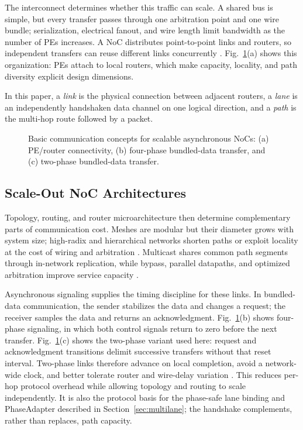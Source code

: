 \documentclass[conference]{IEEEtran}
\begin{document}
The interconnect determines whether this traffic can scale. A shared bus is
simple, but every transfer passes through one arbitration point and one wire
bundle; serialization, electrical fanout, and wire length limit bandwidth as
the number of PEs increases. A NoC distributes point-to-point links and
routers, so independent transfers can reuse different links concurrently
\cite{dally2004book,krishna2013smart}. Fig.~\ref{fig:basic-concepts}(a)
shows this organization: PEs attach to local routers, which make capacity,
locality, and path diversity explicit design dimensions.

In this paper, a \emph{link} is the physical connection between adjacent
routers, a \emph{lane} is an independently handshaken data channel on one
logical direction, and a \emph{path} is the multi-hop route followed by a
packet.

\begin{figure}[!t]
\centering

\caption{Basic communication concepts for scalable asynchronous NoCs:
(a) PE/router connectivity, (b) four-phase bundled-data transfer, and
(c) two-phase bundled-data transfer.}
\label{fig:basic-concepts}
\end{figure}

\subsection{Scale-Out NoC Architectures}\label{sec:scaleout-bg}

Topology, routing, and router microarchitecture then determine complementary
parts of communication cost. Meshes are modular but their diameter grows
with system size; high-radix and hierarchical networks shorten paths or
exploit locality at the cost of wiring and arbitration
\cite{zhong2025paicore}. Multicast shares common path segments through
in-network replication, while bypass, parallel datapaths, and optimized
arbitration improve service capacity
\cite{merolla2014tree,bhardwaj2019cmr,su2025hbs,krishna2013smart,rasheed2014storm,fischer2025floonoc}.

Asynchronous signaling supplies the timing discipline for these links. In
bundled-data communication, the sender stabilizes the data and changes a
request; the receiver samples the data and returns an acknowledgment.
Fig.~\ref{fig:basic-concepts}(b) shows four-phase signaling, in which both
control signals return to zero before the next transfer. Fig.~\ref{fig:basic-concepts}(c)
shows the two-phase variant used here: request and acknowledgment transitions
delimit successive transfers without that reset interval. Two-phase links
therefore advance on local completion, avoid a network-wide clock, and better
tolerate router and wire-delay variation
\cite{ghiribaldi2013transition,jiang2017async14nm,zhang2026reusable}.
This reduces per-hop protocol overhead while allowing topology and routing to
scale independently. It is also the protocol basis for the phase-safe lane
binding and PhaseAdapter described in Section~\ref{sec:multilane}; the
handshake complements, rather than replaces, path capacity.
\end{document}
